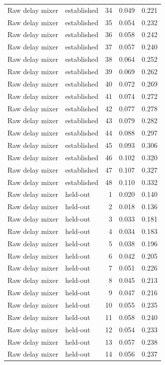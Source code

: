 \begin{tabular}{llrrr}
Raw delay mixer & established & 34 & 0.049 & 0.221 \\
Raw delay mixer & established & 35 & 0.054 & 0.232 \\
Raw delay mixer & established & 36 & 0.058 & 0.242 \\
Raw delay mixer & established & 37 & 0.057 & 0.240 \\
Raw delay mixer & established & 38 & 0.064 & 0.252 \\
Raw delay mixer & established & 39 & 0.069 & 0.262 \\
Raw delay mixer & established & 40 & 0.072 & 0.269 \\
Raw delay mixer & established & 41 & 0.074 & 0.272 \\
Raw delay mixer & established & 42 & 0.077 & 0.278 \\
Raw delay mixer & established & 43 & 0.079 & 0.282 \\
Raw delay mixer & established & 44 & 0.088 & 0.297 \\
Raw delay mixer & established & 45 & 0.093 & 0.306 \\
Raw delay mixer & established & 46 & 0.102 & 0.320 \\
Raw delay mixer & established & 47 & 0.107 & 0.327 \\
Raw delay mixer & established & 48 & 0.110 & 0.332 \\
Raw delay mixer & held-out & 1 & 0.020 & 0.140 \\
Raw delay mixer & held-out & 2 & 0.018 & 0.136 \\
Raw delay mixer & held-out & 3 & 0.033 & 0.181 \\
Raw delay mixer & held-out & 4 & 0.034 & 0.183 \\
Raw delay mixer & held-out & 5 & 0.038 & 0.196 \\
Raw delay mixer & held-out & 6 & 0.042 & 0.205 \\
Raw delay mixer & held-out & 7 & 0.051 & 0.226 \\
Raw delay mixer & held-out & 8 & 0.045 & 0.213 \\
Raw delay mixer & held-out & 9 & 0.047 & 0.216 \\
Raw delay mixer & held-out & 10 & 0.055 & 0.235 \\
Raw delay mixer & held-out & 11 & 0.058 & 0.240 \\
Raw delay mixer & held-out & 12 & 0.054 & 0.233 \\
Raw delay mixer & held-out & 13 & 0.057 & 0.238 \\
Raw delay mixer & held-out & 14 & 0.056 & 0.237 \\

\end{tabular}
